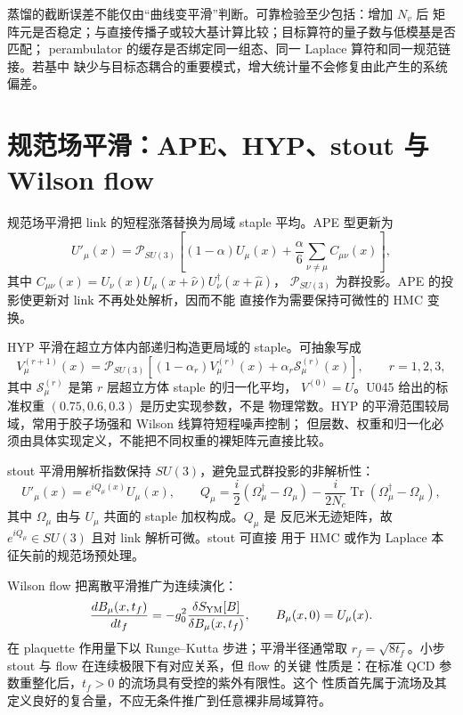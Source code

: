 蒸馏的截断误差不能仅由“曲线变平滑”判断。可靠检验至少包括：增加 \(N_v\) 后
矩阵元是否稳定；与直接传播子或较大基计算比较；目标算符的量子数与低模基是否匹配；
perambulator 的缓存是否绑定同一组态、同一 Laplace 算符和同一规范链接。若基中
缺少与目标态耦合的重要模式，增大统计量不会修复由此产生的系统偏差。

\section{规范场平滑：APE、HYP、stout 与 Wilson flow}

规范场平滑把 link 的短程涨落替换为局域 staple 平均。APE 型更新为
\begin{equation}
  U'_\mu(x)=\mathcal P_{SU(3)}\left[
  (1-\alpha)U_\mu(x)+\frac{\alpha}{6}\sum_{\nu\ne\mu}C_{\mu\nu}(x)\right],
  \label{eq:b03-ape}
\end{equation}
其中
\(C_{\mu\nu}(x)=U_\nu(x)U_\mu(x+\hat\nu)U_\nu^\dagger(x+\hat\mu)\)，
\(\mathcal P_{SU(3)}\) 为群投影。APE 的投影使更新对 link 不再处处解析，因而不能
直接作为需要保持可微性的 HMC 变换。

HYP 平滑在超立方体内部递归构造更局域的 staple。可抽象写成
\begin{equation}
  V^{(r+1)}_\mu(x)=\mathcal P_{SU(3)}\left[
  (1-\alpha_r)V^{(r)}_\mu(x)+\alpha_r\mathcal S^{(r)}_\mu(x)\right],
  \qquad r=1,2,3,
  \label{eq:b03-hyp}
\end{equation}
其中 \(\mathcal S^{(r)}_\mu\) 是第 \(r\) 层超立方体 staple 的归一化平均，
\(V^{(0)}=U\)。U045 给出的标准权重 \((0.75,0.6,0.3)\) 是历史实现参数，不是
物理常数。HYP 的平滑范围较局域，常用于胶子场强和 Wilson 线算符短程噪声控制；
但层数、权重和归一化必须由具体实现定义，不能把不同权重的裸矩阵元直接比较。

stout 平滑用解析指数保持 \(SU(3)\)，避免显式群投影的非解析性：
\begin{equation}
  U'_\mu(x)=e^{iQ_\mu(x)}U_\mu(x),
  \qquad
  Q_\mu=\frac{i}{2}\left(\Omega_\mu^\dagger-\Omega_\mu\right)
  -\frac{i}{2N_c}\operatorname{Tr}
  \left(\Omega_\mu^\dagger-\Omega_\mu\right),
  \label{eq:b03-stout}
\end{equation}
其中 \(\Omega_\mu\) 由与 \(U_\mu\) 共面的 staple 加权构成。\(Q_\mu\) 是
反厄米无迹矩阵，故 \(e^{iQ_\mu}\in SU(3)\) 且对 link 解析可微。stout 可直接
用于 HMC 或作为 Laplace 本征矢前的规范场预处理。

Wilson flow 把离散平滑推广为连续演化：
\begin{equation}
  \frac{dB_\mu(x,t_f)}{dt_f}
  =-g_0^2\frac{\delta S_{\rm YM}[B]}{\delta B_\mu(x,t_f)},
  \qquad B_\mu(x,0)=U_\mu(x).
  \label{eq:b03-flow}
\end{equation}
在 plaquette 作用量下以 Runge--Kutta 步进；平滑半径通常取
\(r_f=\sqrt{8t_f}\)。小步 stout 与 flow 在连续极限下有对应关系，但 flow 的关键
性质是：在标准 QCD 参数重整化后，\(t_f>0\) 的流场具有受控的紫外有限性。这个
性质首先属于流场及其定义良好的复合量，不应无条件推广到任意裸非局域算符。

